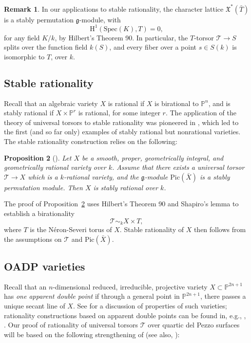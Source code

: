 \documentclass[12pt, reqno]{amsart}
\theoremstyle{plain}
\newtheorem{prop}{Proposition}[section]
\theoremstyle{remark}
\theoremstyle{definition}
\newtheorem{rema}[prop]{Remark}
\numberwithin{equation}{section}
\def\cT{{\mathcal T}}
\def\bP{{\mathbb P}}
\def\rH{{\mathrm H}}
\def\Pic{\mathrm{Pic}}
\def\Spec{\mathrm{Spec}}
\begin{document}
\begin{rema}
\label{rema:split}
In our applications to stable rationality, the character lattice
$\mathfrak X^*(\bar{T})$ is a stably permutation $\mathfrak g$-module, with 
$$
\rH^1(\Spec(K),T)=0, 
$$
for any field $K/k$, by Hilbert's Theorem 90. In particular, the $T$-torsor $\cT\to S$ splits over the function field $k(S)$, and every fiber over a point $s\in S(k)$ is isomorphic to $T$, over $k$. 
\end{rema}


\subsection*{Stable rationality}
Recall that an algebraic variety $X$ is rational if $X$ is birational to $\bP^n$, and is stably rational if $X\times\bP^{r}$ is rational, for some integer $r$.
The application of the theory of universal torsors to 
stable rationality was pioneered in \cite{bctspstably}, which led to the first (and so far only) examples of stably rational but nonrational varieties. The stable rationality construction relies on the following:

\begin{prop}[{\cite[Proposition 3]{bctspstably}}]\label{prop:bctsmain}
    Let 
$X$ be a smooth, proper, geometrically integral, and geometrically rational 
variety over $k$. Assume that 
there exists a universal torsor 
$\cT\to X$ which is a
$k$-rational variety, and the 
$\mathfrak g$-module $\Pic(\bar{X})$ is a stably permutation module. Then $X$ is stably rational over $k$.
\end{prop}

The proof of Proposition~\ref{prop:bctsmain} uses Hilbert's Theorem 90 and Shapiro's lemma to establish a birationality 
$$
\cT\sim_k X\times T,
$$
where $T$ is the N\'eron-Severi torus of $X$.
Stable rationality of $X$ then follows from the assumptions on $\cT$ and $\Pic(\bar{X})$. 


\subsection*{OADP varieties}
Recall that an $n$-dimensional reduced, irreducible, projective variety $X\subset \bP^{2n+1}$ has {\em one apparent double point} if through a general point in $\bP^{2n+1}$, there passes a unique secant line of $X$.
 See \cite{projection} for a discussion of properties of such varieties; rationality constructions based on apparent double points can be found in, e.g., \cite{CMR}, \cite[Sections 3 and 7]{HKT-quad}. 
Our proof of rationality of universal torsors $\cT$ over quartic del Pezzo surfaces will be based on the following strengthening of \cite[Theorem 2.7]{projection} (see also, \cite[Theorem 4.1]{CMR}):
\end{document}
